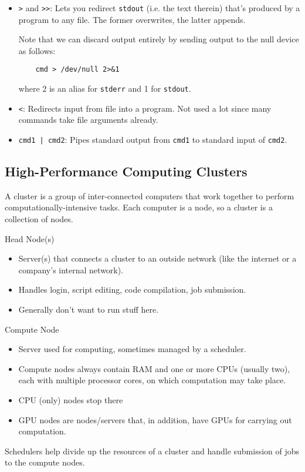 \documentclass[12pt]{article}
\theoremstyle{plain}
\theoremstyle{definition}
\theoremstyle{remark}
\begin{document}
\begin{itemize}

  \item \texttt{>} and \texttt{>>}: Lets you redirect \texttt{stdout}
    (i.e. the text therein) that's produced by a program to any file.
    The former overwrites, the latter appends.

    Note that we can discard output entirely by sending output to the
    null device as follows:
    \lstset{style=bash}
    \begin{lstlisting}
    cmd > /dev/null 2>&1
    \end{lstlisting}
    where 2 is an alias for \texttt{stderr} and 1 for \texttt{stdout}.

  \item \texttt{<}: Redirects input from file into a program.
    Not used a lot since many commands take file arguments already.

  \item
    \texttt{cmd1 | cmd2}:	Pipes standard output from \texttt{cmd1} to
    standard input of \texttt{cmd2}.
\end{itemize}


\clearpage
\subsection{High-Performance Computing Clusters}

A cluster is a group of inter-connected computers that work together to
perform computationally-intensive tasks.
Each computer is a node, so a cluster is a collection of nodes.

Head Node(s)
\begin{itemize}
  \item Server(s) that connects a cluster to an outside network (like
    the internet or a company's internal network).
  \item Handles login, script editing, code compilation, job submission.
  \item Generally don't want to run stuff here.
\end{itemize}
Compute Node
\begin{itemize}
\item Server used for computing, sometimes managed by a scheduler.
\item Compute nodes always contain RAM and one or more CPUs (usually
  two), each with multiple processor cores, on which computation may
  take place.
\item CPU (only) nodes stop there
\item GPU nodes are nodes/servers that, in addition, have GPUs for
  carrying out computation.
\end{itemize}
Schedulers help divide up the resources of a cluster and handle
submission of jobs to the compute nodes.
\end{document}
